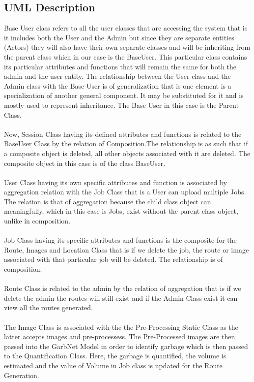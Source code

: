 \subsection{UML Description}
Base User class refers to all the user classes that are accessing the system that is it includes both the User and the Admin but since they are separate entities (Actors) they will also have their own separate classes and will be inheriting from the parent class which in our case is the BaseUser. This particular class contains its particular attributes and functions that will remain the same for both the admin and the user entity. The relationship between the User class and the Admin class with the Base User is of generalization that is one element is a specialization of another general component. It may be substituted for it and is mostly used to represent inheritance. The Base User in this case is the Parent Class.\\
\\Now, Session Class having its defined attributes and functions is related to the BaseUser Class by the relation of Composition.The relationship is as such that if a composite object is deleted, all other objects associated with it are deleted. The composite object in this case is of the class BaseUser.\\
\\User Class having its own specific attributes and function is associated by aggregation relation with the Job Class that is a User can upload multiple Jobs. The relation is that of aggregation because the child class object can meaningfully, which in this case is Jobs, exist without the parent class object, unlike in composition.\\
\\Job Class having its specific attributes and functions is the composite for the Route, Images and Location Class that is if we delete the job, the route or image associated with that particular job will be deleted. The relationship is of composition.\\
\\Route Class is related to the admin by the relation of aggregation that is if we delete the admin the routes will still exist and if the Admin Class exist it can view all the routes generated.\\
\\The Image Class is associated with the the Pre-Processing Static Class as the latter accepts images and pre-processess. The Pre-Processed images are then passed into the GarbNet Model in order to identify garbage which is then passed to the Quantification Class. Here, the garbage is quantified, the volume is estimated and the value of Volume in Job class is updated for the Route Generation.


